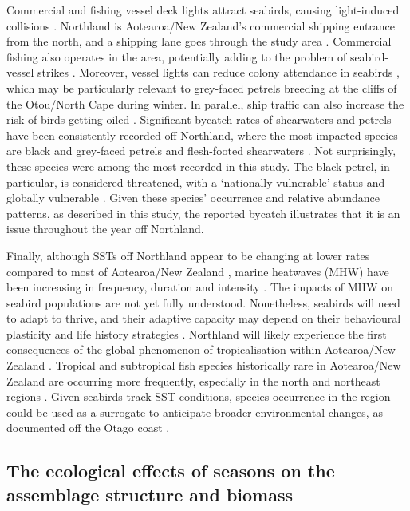 \documentclass[preprint, 3p, authoryear]{elsarticle} %
\begin{document}
Commercial and fishing vessel deck lights attract seabirds, causing light-induced collisions \citep{black2005, merkel2011}. Northland is Aotearoa/New Zealand's commercial shipping entrance from the north, and a shipping lane goes through the study area \citep{lundquist2025}. Commercial fishing also operates in the area, potentially adding to the problem of seabird-vessel strikes \citep{ryan2021}. Moreover, vessel lights can reduce colony attendance in seabirds \citep{austad2023}, which may be particularly relevant to grey-faced petrels breeding at the cliffs of the Otou/North Cape during winter. In parallel, ship traffic can also increase the risk of birds getting oiled \citep{renner2015, wagner2023}. Significant bycatch rates of shearwaters and petrels have been consistently recorded off Northland, where the most impacted species are black and grey-faced petrels and flesh-footed shearwaters \citep{abraham2020}. Not surprisingly, these species were among the most recorded in this study. The black petrel, in particular, is considered threatened, with a `nationally vulnerable' status and globally vulnerable \citep{robertson2021}. Given these species' occurrence and relative abundance patterns, as described in this study, the reported bycatch illustrates that it is an issue throughout the year off Northland.

Finally, although SSTs off Northland appear to be changing at lower rates compared to most of Aotearoa/New Zealand \citep{sutton2019}, marine heatwaves (MHW) have been increasing in frequency, duration and intensity \citep{montie2024}. The impacts of MHW on seabird populations are not yet fully understood. Nonetheless, seabirds will need to adapt to thrive, and their adaptive capacity may depend on their behavioural plasticity and life history strategies \citep{woehler2024}. Northland will likely experience the first consequences of the global phenomenon of tropicalisation within Aotearoa/New Zealand \citep{zarzyczny2024}. Tropical and subtropical fish species historically rare in Aotearoa/New Zealand are occurring more frequently, especially in the north and northeast regions \citep{middleton2023}. Given seabirds track SST conditions, species occurrence in the region could be used as a surrogate to anticipate broader environmental changes, as documented off the Otago coast \citep{daudt2025}.

\subsection{The ecological effects of seasons on the assemblage structure and biomass}
\end{document}
